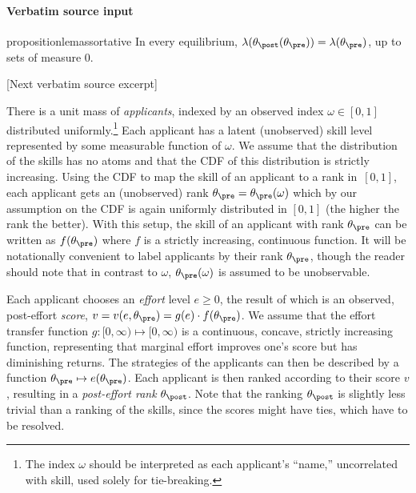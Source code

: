 \documentclass[10pt]{article}
\begin{document}
\paragraph{Verbatim source input}
\begin{ReviewVerbatim}
\begin{restatable}{proposition}{lemassortative}
	\label{lem:rankpreservedindex}
In every equilibrium, $ \lambda(\theta_\post(\theta_\pre))=\lambda(\theta_\pre)$, up to %
{sets of} measure 0. %
\end{restatable}

[Next verbatim source excerpt]

There is a unit mass of \textit{applicants}, indexed by an observed index $\omega \in [0,1]$ distributed uniformly.\footnote{The index $\omega$ should be interpreted as each applicant's ``name,'' uncorrelated with skill, used solely for tie-breaking.}  Each applicant has a latent (unobserved) skill level represented by some measurable function of $\omega$.
We assume that {the distribution of the skills} has no atoms and that the CDF of this distribution is strictly increasing.
Using the CDF to map the skill of an applicant to a rank in~$[0,1]$, each applicant gets an (unobserved) rank $\theta_\pre =\theta_\pre(\omega)$ which by our assumption on the CDF is again uniformly distributed in $[0, 1]$ (the higher the rank the better).  With this setup, the skill of an applicant with rank $\theta_\pre$ can be written as $f(\theta_\pre)$ where $f$ is a strictly increasing, continuous function.  {It will be notationally convenient to label applicants by their rank $\theta_\pre$, though the reader should note that in contrast to $\omega$, $\theta_\pre(\omega)$ is assumed to be unobservable.}



Each applicant chooses an \textit{effort} level $e \ge 0$, the result of which is an observed, post-effort \textit{score}, {$v=v(e,\theta_\pre) = {g(e)}\cdot{f(\theta_\pre)}$}. 
{We assume} that the effort transfer function $g: [0, \infty) \mapsto [0, \infty)$ is a continuous, concave, strictly increasing function, representing that marginal effort improves one's score but has diminishing returns.
{%
{T}he strategies of the applicants can {then} be described by a function $\theta_\pre \mapsto e(\theta_\pre)$.
}
  Each {applicant} is then ranked according to their score $v$%
, resulting in a \textit{post-effort rank} $\theta_\post$.
Note that the ranking $\theta_\post$ is slightly less trivial than a ranking of the skills, since the scores might have ties, which have to be resolved.


\end{ReviewVerbatim}
\end{document}

